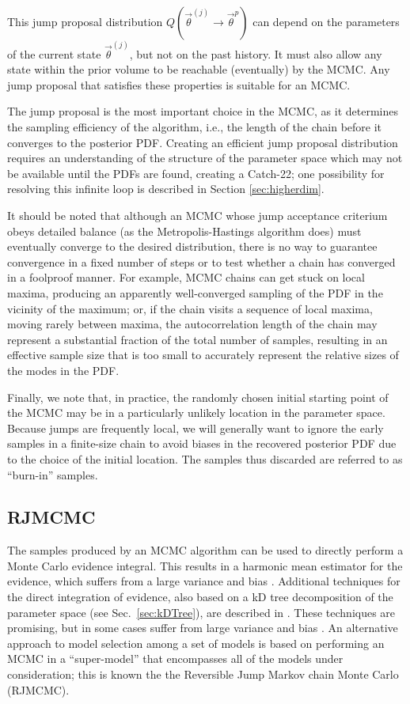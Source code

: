 \documentclass{iopart}
\newcommand{\vtheta}{\vec{\theta}}
\begin{document}
This jump proposal distribution $Q(\vtheta^{(j)} \to \vtheta^p)$ can
depend on the parameters of the current state $\vtheta^{(j)}$, but not
on the past history.  It must also allow any state within the prior
volume to be reachable (eventually) by the MCMC.  Any jump proposal
that satisfies these properties is suitable for an MCMC.

The jump proposal is the most important choice in the MCMC, as it
determines the sampling efficiency of the algorithm, i.e., the length
of the chain before it converges to the posterior PDF.  Creating an
efficient jump proposal distribution requires an understanding of the
structure of the parameter space which may not be available until the
PDFs are found, creating a Catch-22; one possibility for resolving
this infinite loop is described in Section \ref{sec:higherdim}.

It should be noted that although an MCMC whose jump acceptance
criterium obeys detailed balance (as the Metropolis-Hastings algorithm
does) must eventually converge to the desired distribution, there is
no way to guarantee convergence in a fixed number of steps or to test
whether a chain has converged in a foolproof manner.  For example,
MCMC chains can get stuck on local maxima, producing an apparently
well-converged sampling of the PDF in the vicinity of the maximum; or,
if the chain visits a sequence of local maxima, moving rarely between
maxima, the autocorrelation length of the chain may represent a
substantial fraction of the total number of samples, resulting in an
effective sample size that is too small to accurately represent the
relative sizes of the modes in the PDF.

Finally, we note that, in practice, the randomly chosen initial
starting point of the MCMC may be in a particularly unlikely location
in the parameter space.  Because jumps are frequently local, we will
generally want to ignore the early samples in a finite-size chain to
avoid biases in the recovered posterior PDF due to the choice of the
initial location.  The samples thus discarded are referred to as
``burn-in'' samples. 

\subsection{RJMCMC}\label{RJMCMC}

The samples produced by an MCMC algorithm can be used to directly
perform a Monte Carlo evidence integral.  This results in a harmonic
mean estimator for the evidence, which suffers from a large variance
and bias \cite{NewtonRaftery:1994,Chib:1995,vanHaasteren:2009}.
Additional techniques for the direct integration of evidence, also
based on a kD tree decomposition of the parameter space (see
Sec.~\ref{sec:kDTree}), are described in \cite{Weinberg2009}.  These
techniques are promising, but in some cases suffer 
from large variance and bias \cite{Farr2010}.  An alternative approach to model
selection among a set of models is based on performing an MCMC in a
``super-model'' that encompasses all of the models under
consideration; this is known the the Reversible Jump Markov chain
Monte Carlo (RJMCMC).
\end{document}
